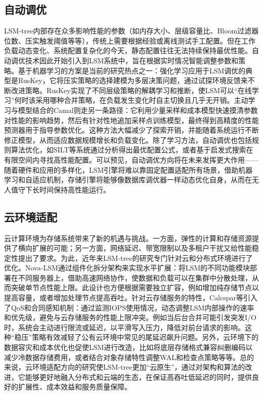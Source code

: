 \documentclass[lang=cn,11pt,a4paper]{elegantpaper}
\begin{document}
	\subsection{自动调优}
	LSM-tree内部存在众多影响性能的参数（如内存大小、层级容量比、Bloom过滤器位数、压实触发阈值等等），传统上需要根据经验或离线测试手工配置。但在工作负载动态变化、系统配置复杂化的今天，静态配置往往无法持续保持最优性能。自动调优技术因此开始引入到LSM系统中，旨在根据实时情况智能调整参数和策略。基于机器学习的方案是当前的研究热点之一：强化学习应用于LSM调优的典型是RusKey，它将压实策略的选择建模为多层决策问题，通过试探环境反馈来不断改进策略。RusKey实现了不同层级策略的解耦学习和推断，使LSM可以“在线学习”何时该采用哪种合并策略，在负载发生变化时自主切换且几乎无开销\cite{DBLP:journals/pacmmod/MoCLS23}。主动学习与模型结合的Camal则走另一条路径：它利用少量采样和成本模型快速摸清参数对性能的影响趋势，然后有针对性地追加采样点训练模型，最终得到高精度的性能预测器用于指导参数优化\cite{DBLP:journals/pacmmod/YuLYC24}。这种方法大幅减少了探索开销，并能随着系统运行不断修正模型，从而适应数据规模增长和负载变化。除了学习方法，自动调优也包括规则算法优化，如SILT等系统通过分析得出最优配置公式，或者基于启发式搜索在有限空间内寻找高性能配置。可以预见，自动调优方向将在未来发挥更大作用——随着硬件和应用的多样化，LSM引擎将难以靠固定配置适配所有场景，借助机器学习和自适应机制，存储引擎将能够像数据库调优器一样动态优化自身，从而在无人值守下长时间保持高性能运行。
	
	\subsection{云环境适配}
	云计算环境为存储系统带来了新的机遇与挑战。一方面，弹性的计算和存储资源提供了横向扩展的可能；另一方面，网络延迟、带宽限制以及多租户干扰又给性能稳定性提出了要求。为此，近年来LSM-tree的研究专门针对云和分布式环境进行了优化。Nova-LSM通过组件化拆分架构来实现水平扩展：将LSM的不同功能模块部署在不同服务器上，借助高速网络协作，使数据和负载可以在集群中分散处理，从而突破单节点性能上限\cite{DBLP:conf/sigmod/HuangG21}。此设计也方便根据需要独立扩容，例如增加纯存储节点以提高容量，或者增加处理节点提高吞吐。针对云存储服务的特性，Calcspar等引入了QoS和合同感知机制：通过监测IOPS使用情况，动态调整LSM内部操作的速率和优先级，避免与云存储服务的性能上限冲突\cite{DBLP:conf/usenix/ZhouZCXWWLZW23}。例如当后台合并可能引发突发I/O时，系统会主动进行限流或延迟，以平滑写入压力，降低对前台请求的影响。这种“稳压”策略有效减轻了公有云环境中常见的尾延迟飙升问题。另外，云环境下的数据容灾和成本优化也促使LSM进行改造，比如将底层存储格式兼容纠删编码以减少冷数据存储费用\cite{DBLP:conf/fast/RenR0HLL24}，或者结合对象存储特性调整WAL和检查点策略等等。总的来说，云环境适配方向的研究使LSM-tree更加“云原生”，通过对架构和算法的改进，它能够更好地融入分布式和云端的生态，在保证高吞吐低延迟的同时，提供良好的扩展性、成本效益和服务质量保障。
	
	\printbibliography[heading=bibintoc, title=\ebibname]
	
	\appendix
	\addappheadtotoc
	
\end{document}
